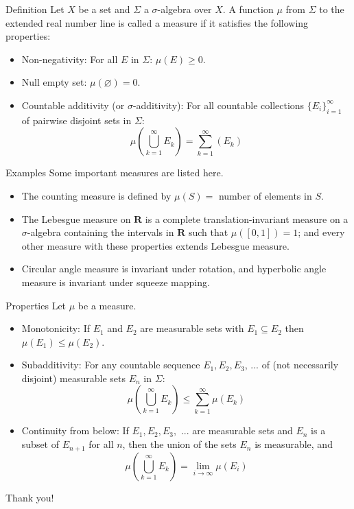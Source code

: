 \documentclass[10pt]{beamer}
\begin{document}
\begin{frame}{Definition}
Let $X$ be a set and ${\varSigma}$ a $\sigma$-algebra over $X$. A function $\mu$ from $\varSigma$ to the extended real number line is called a measure if it satisfies the following properties:
\begin{itemize}
\item{Non-negativity: For all $E$ in $\varSigma$: $\mu(E) \geq0$.}
\item{Null empty set: $\mu( \varnothing ) = 0.$}
\item{Countable additivity (or $\sigma$-additivity): For all countable collections ${\displaystyle \{E_{i}\}_{i=1}^{\infty }}$ of pairwise disjoint sets in $\varSigma$:
    $$\mu\left(\bigcup_{k=1}^{\infty}E_{k}\right)=\sum_{k=1}^{\infty}(E_{k})$$}
\end{itemize}
\end{frame}

\begin{frame}{Examples}
Some important measures are listed here.
\begin{itemize}

\item{The counting measure is defined by $\mu(S) = $ number of elements in $S$.}
\item {The Lebesgue measure on $\mathbf{R}$ is a complete translation-invariant measure on a $\sigma$-algebra containing the intervals in $\mathbf{R}$ such that $\mu([0, 1]) = 1$; and every other measure with these properties extends Lebesgue measure.}
\item{Circular angle measure is invariant under rotation, and hyperbolic angle measure is invariant under squeeze mapping.}
\end{itemize}
\end{frame}


\begin{frame}{Properties}
Let $\mu$ be a measure.
\begin{footnotesize}
\begin{itemize}
\item{Monotonicity: If $E_{1}$ and $E_{2}$ are measurable sets with $E_{1}\subseteq E_{2}$ then $\mu (E_{1})\leq \mu (E_{2})$.}
\item{Subadditivity: For any countable sequence $E_{1}, E_{2}, E_{3}$, ... of (not necessarily disjoint) measurable sets $E_{n}$ in $\varSigma$:
$$\mu\left(\bigcup_{k=1}^{\infty}E_{k}\right)\leq\sum_{k=1}^{\infty}\mu(E_{k})$$}
\item{Continuity from below: If $E_{1}, E_{2}, E_{3},$ ... are measurable sets and $E_{n}$ is a subset of $E_{n+1}$ for all $n$, then the union of the sets $E_{n}$ is measurable, and
    $$\mu\left(\bigcup_{k=1}^{\infty}E_{k}\right)=\lim_{i\rightarrow \infty}\mu(E_{i})$$}
\end{itemize}
\end{footnotesize}
\end{frame}
\begin{frame}
\begin{Huge}
\begin{center}
Thank you!
\end{center}
\end{Huge}
\end{frame}
\end{document}
